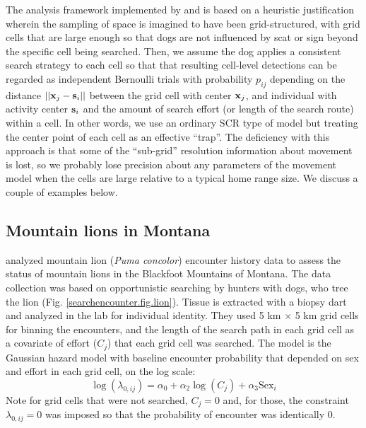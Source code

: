 The analysis framework implemented by
\citet{thompson_etal:2012} and \citet{russell_etal:2012} is based on a
heuristic justification wherein the sampling of space is imagined to
have been grid-structured, with
grid cells that are large enough so that dogs are not influenced by
scat or sign beyond the
specific cell being searched. Then, we assume the dog applies a
consistent search strategy to each cell so that that resulting
cell-level detections can be regarded as independent Bernoulli trials
with probability $p_{ij}$ depending on the distance $||{\bf x}_j -
{\bf s}_{i}||$ between the grid cell with center ${\bf x}_{j}$, and individual with activity center ${\bf
  s}_{i}$ and the amount of search effort (or length of the search
route) within a cell. 
In other words, 
we use an ordinary SCR type of model but treating 
the center point of each cell as an effective ``trap''.
The deficiency with this approach is that some of the ``sub-grid''
resolution information about movement is lost, so we probably lose
precision about any parameters of the movement model when the cells
are large relative to a typical home range size. We discuss a couple
of examples below. 

\subsection{Mountain lions in Montana}

\citet{russell_etal:2012} analyzed mountain lion ({\it Puma concolor})
encounter history data to assess the status of mountain lions in the
Blackfoot Mountains of Montana.  The data collection was based on
opportunistic searching by hunters with dogs, who tree the lion
(Fig. \ref{searchencounter.fig.lion}).
Tissue is extracted with a biopsy dart and analyzed in the lab for
individual identity.
 They used 5 km $\times$ 5 km grid cells for
binning the encounters, and the length of the search path in each grid
cell as a covariate of effort
($C_j$) 
that each grid cell was searched.  The
model is the Gaussian hazard model with baseline encounter probability
that depended on sex and effort in each grid cell, on the log scale:
\[
 \log(\lambda_{0,ij}) = \alpha_{0} + \alpha_{2} \log(C_{j}) + \alpha_{3} \mbox{Sex}_{i}
\]
Note for grid cells that were not searched, $C_{j} =0$ and, for those,
the constraint $\lambda_{0,ij}=0$ was imposed so that the probability
of encounter was identically 0.

